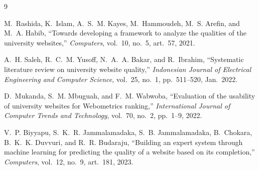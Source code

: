 \documentclass[11pt,a4paper]{article}
\begin{document}
\newpage
\begin{thebibliography}{9}

M.~Rashida, K.~Islam, A.~S.~M. Kayes, M.~Hammoudeh, M.~S. Arefin, and M.~A. Habib,
``Towards developing a framework to analyze the qualities of the university websites,''
\emph{Computers}, vol.~10, no.~5, art.~57, 2021.

A.~H. Saleh, R.~C.~M. Yusoff, N.~A.~A. Bakar, and R.~Ibrahim,
``Systematic literature review on university website quality,''
\emph{Indonesian Journal of Electrical Engineering and Computer Science},
vol.~25, no.~1, pp.~511--520, Jan.~2022.

D.~Mukanda, S.~M. Mbuguah, and F.~M. Wabwoba,
``Evaluation of the usability of university websites for Webometrics ranking,''
\emph{International Journal of Computer Trends and Technology}, vol.~70, no.~2, pp.~1--9, 2022.

V.~P. Biyyapu, S.~K.~R. Jammalamadaka, S.~B. Jammalamadaka, B.~Chokara, B.~K.~K. Duvvuri, and
R.~R. Budaraju,
``Building an expert system through machine learning for predicting the quality of a website based on
its completion,''
\emph{Computers}, vol.~12, no.~9, art.~181, 2023.

\end{thebibliography}
\end{document}
